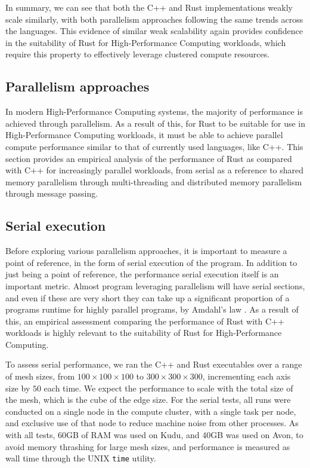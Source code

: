 In summary, we can see that both the C++ and Rust implementations weakly scale similarly, with both parallelism approaches following the same trends across the languages. This evidence of similar weak scalability again provides confidence in the suitability of Rust for High-Performance Computing workloads, which require this property to effectively leverage clustered compute resources.




\subsection{Parallelism approaches}
\label{ssec:parallelism-approaches}

In modern High-Performance Computing systems, the majority of performance is achieved through parallelism. As a result of this, for Rust to be suitable for use in High-Performance Computing workloads, it must be able to achieve parallel compute performance similar to that of currently used languages, like C++. This section provides an empirical analysis of the performance of Rust as compared with C++ for increasingly parallel workloads, from serial as a reference to shared memory parallelism through multi-threading and distributed memory parallelism through message passing.

\subsection{Serial execution}
\label{ssec:multi-threaded}

Before exploring various parallelism approaches, it is important to measure a point of reference, in the form of serial execution of the program. In addition to just being a point of reference, the performance serial execution itself is an important metric. Almost program leveraging parallelism will have serial sections, and even if these are very short they can take up a significant proportion of a programs runtime for highly parallel programs, by Amdahl's law \cite{amdahlsLaw}. As a result of this, an empirical assessment comparing the performance of Rust with C++ workloads is highly relevant to the suitability of Rust for High-Performance Computing.

To assess serial performance, we ran the C++ and Rust executables over a range of mesh sizes, from $100 \times 100 \times 100$ to $300 \times 300 \times 300$, incrementing each axis size by $50$ each time. We expect the performance to scale with the total size of the mesh, which is the cube of the edge size. For the serial tests, all runs were conducted on a single node in the compute cluster, with a single task per node, and exclusive use of that node to reduce machine noise from other processes. As with all tests, 60GB of RAM was used on Kudu, and 40GB was used on Avon, to avoid memory thrashing for large mesh sizes, and performance is measured as wall time through the UNIX \texttt{time} utility.

